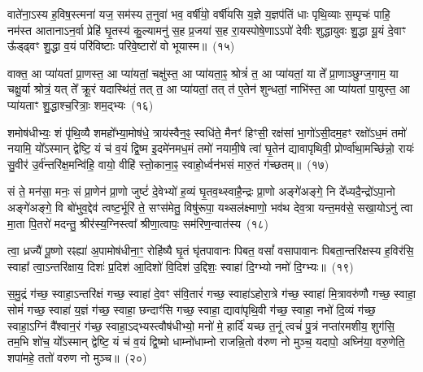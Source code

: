 वाते॑ना॒\-ऽस्य ह॒विष॒स्त्मना॑ यज॒ सम॑स्य त॒नुवा॑ भव॒ वर्\mbox{}षी॑यो॒ वर्\mbox{}षी॑यसि य॒ज्ञे य॒ज्ञप॑तिं धाः पृथि॒व्याः स॒म्पृचः॑ पाहि॒ नम॑स्त आताना\-ऽन॒र्वा प्रेहि॑ घृ॒तस्य॑ कु॒ल्यामनु॑ स॒ह प्र॒जया॑ स॒ह रा॒यस्पोषे॒णा\-ऽ\-ऽपो॑ देवीः शुद्धायुवः शु॒द्धा यू॒यं दे॒वाꣳ ऊ᳚ड्ढ्वꣳ शु॒द्धा व॒यं परि॑विष्टाः परिवे॒ष्टारो॑ वो भूयास्म॥~(१५)

{\anuvakamend[{दे॒वेन॒ चतु॑श्चत्वारिꣳशच्च}]}%

वाक्त॒ आ प्या॑यतां प्रा॒णस्त॒ आ प्या॑यतां॒ चक्षु॑स्त॒ आ प्या॑यता॒ꣴ॒ श्रोत्रं॑ त॒ आ प्या॑यतां॒ या ते᳚ प्रा॒णाञ्छुग्ज॒गाम॒ या चक्षु॒र्या श्रोत्रं॒ यत् ते᳚ क्रू॒रं यदास्थि॑तं॒ तत् त॒ आ प्या॑यतां॒ तत् त॑ ए॒तेन॑ शुन्धतां॒ नाभि॑स्त॒ आ प्या॑यतां पा॒युस्त॒ आ प्या॑यताꣳ शु॒द्धाश्च॒रित्राः॒ शम॒द्भ्यः~(१६)

शमोष॑धीभ्यः॒ शं पृ॑थि॒व्यै शमहो᳚भ्या॒मोष॑धे॒ त्राय॑स्वैन॒ꣴ॒ स्वधि॑ते॒ मैनꣳ॑ हिꣳसी॒ रक्ष॑सां भा॒गो॑\-ऽसी॒दम॒हꣳ रक्षो॑\-ऽध॒मं तमो॑ नयामि॒ यो᳚\-ऽस्मान् द्वेष्टि॒ यं च॑ व॒यं द्वि॒ष्म इ॒दमे॑नमध॒मं तमो॑ नयामी॒षे त्वा॑ घृ॒तेन॑ द्यावा\-पृथिवी॒ प्रोर्ण्वा॑था॒मच्छि॑न्नो॒ रायः॑ सु॒वीर॑ उ॒र्व॑न्तरि॑क्ष॒मन्वि॑हि॒ वायो॒ वीहि॑ स्तो॒काना॒ꣴ॒ स्वाहो॒र्ध्वन॑भसं मारु॒तं ग॑च्छतम्॥~(१७)

{\anuvakamend[{अ॒द्भ्यो वीहि॒ पञ्च॑ च}]}%

सं ते॒ मन॑सा॒ मनः॒ सं प्रा॒णेन॑ प्रा॒णो जुष्टं॑ दे॒वेभ्यो॑ ह॒व्यं घृ॒तव॒थ्स्वाहै॒न्द्रः प्रा॒णो अङ्गे॑अङ्गे॒ नि दे᳚ध्यदै॒न्द्रो॑\-ऽपा॒नो अङ्गे॑अङ्गे॒ वि बो॑भुव॒द्देव॑ त्वष्ट॒र्भूरि॑ ते॒ सꣳस॑मेतु॒ विषु॑रूपा॒ यथ्सल॑क्ष्माणो॒ भव॑थ देव॒त्रा यन्त॒मव॑से॒ सखा॒यो\-ऽनु॑ त्वा मा॒ता पि॒तरो॑ मदन्तु॒ श्रीर॑स्य॒ग्निस्त्वा᳚ श्रीणा॒त्वापः॒ सम॑रिण॒न्वात॑स्य~(१८)

त्वा॒ ध्रज्यै॑ पू॒ष्णो रꣴह्या॑ अ॒पामोष॑धीना॒ꣳ॒ रोहि॑ष्यै घृ॒तं घृ॑तपावानः पिबत॒ वसां᳚ वसापावानः पिबता॒न्तरि॑क्षस्य ह॒विर॑सि॒ स्वाहा᳚ त्वा॒\-ऽन्तरि॑क्षाय॒ दिशः॑ प्र॒दिश॑ आ॒दिशो॑ वि॒दिश॑ उ॒द्दिशः॒ स्वाहा॑ दि॒ग्भ्यो नमो॑ दि॒ग्भ्यः॥~(१९)

{\anuvakamend[{वात॑स्या॒ष्टाविꣳ॑शतिश्च}]}%

स॒मु॒द्रं ग॑च्छ॒ स्वाहा॒\-ऽन्तरि॑क्षं गच्छ॒ स्वाहा॑ दे॒वꣳ स॑वि॒तारं॑ गच्छ॒ स्वाहा॑\-ऽहोरा॒त्रे ग॑च्छ॒ स्वाहा॑ मि॒त्रावरु॑णौ गच्छ॒ स्वाहा॒ सोमं॑ गच्छ॒ स्वाहा॑ य॒ज्ञं ग॑च्छ॒ स्वाहा॒ छन्दाꣳ॑सि गच्छ॒ स्वाहा॒ द्यावा॑पृथि॒वी ग॑च्छ॒ स्वाहा॒ नभो॑ दि॒व्यं ग॑च्छ॒ स्वाहा॒\-ऽग्निं वै᳚श्वान॒रं ग॑च्छ॒ स्वाहा॒\-ऽद्भ्यस्त्वौष॑धीभ्यो॒ मनो॑ मे॒ हार्दि॑ यच्छ त॒नूं त्वचं॑ पु॒त्रं नप्ता॑रमशीय॒ शुग॑सि॒ तम॒भि शो॑च॒ यो᳚\-ऽस्मान् द्वेष्टि॒ यं च॑ व॒यं द्वि॒ष्मो धाम्नो॑धाम्नो राजन्नि॒तो व॑रुण नो मुञ्च॒ यदापो॒ अघ्नि॑या॒ वरु॒णेति॒ शपा॑महे॒ ततो॑ वरुण नो मुञ्च॥~(२०)

